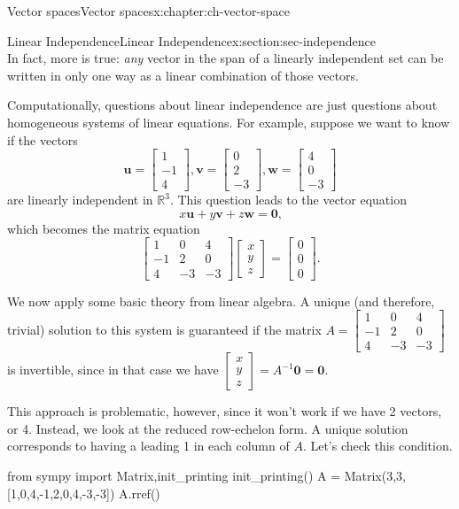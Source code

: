 \documentclass[oneside,10pt,]{book}
\numberwithin{equation}{section}
\newcommand{\bbm}{\begin{bmatrix}}
\newcommand{\ebm}{\end{bmatrix}}
\newcommand{\uu}{\mathbf{u}}
\newcommand{\vv}{\mathbf{v}}
\newcommand{\ww}{\mathbf{w}}
\newcommand{\amp}{&}
\begin{document}
\begin{chapterptx}{Vector spaces}{}{Vector spaces}{}{}{x:chapter:ch-vector-space}
\begin{sectionptx}{Linear Independence}{}{Linear Independence}{}{}{x:section:sec-independence}
\begin{equation*}
\end{equation*}
In fact, more is true: \emph{any} vector in the span of a linearly independent set can be written in only one way as a linear combination of those vectors.%
\par
Computationally, questions about linear independence are just questions about homogeneous systems of linear equations. For example, suppose we want to know if the vectors%
\begin{equation*}
\uu=\bbm 1\\-1\\4\ebm, \vv=\bbm 0\\2\\-3\ebm, \ww=\bbm 4\\0\\-3\ebm
\end{equation*}
are linearly independent in \(\mathbb{R}^3\). This question leads to the vector equation%
\begin{equation*}
x\uu+y\vv+z\ww=\mathbf{0}\text{,}
\end{equation*}
which becomes the matrix equation%
\begin{equation*}
\bbm 1\amp0\amp4\\-1\amp2\amp0\\4\amp-3\amp-3\ebm\bbm x\\y\\z\ebm = \bbm 0\\0\\0\ebm\text{.}
\end{equation*}
%
\par
We now apply some basic theory from linear algebra. A unique (and therefore, trivial) solution to this system is guaranteed if the matrix \(A = \bbm 1\amp0\amp4\\-1\amp2\amp0\\4\amp-3\amp-3\ebm\) is invertible, since in that case we have \(\bbm x\\y\\z\ebm = A^{-1}\mathbf{0} = \mathbf{0}\).%
\par
This approach is problematic, however, since it won't work if we have 2 vectors, or 4. Instead, we look at the reduced row-echelon form. A unique solution corresponds to having a leading 1 in each column of \(A\). Let's check this condition.%
\begin{sageinput}
from sympy import Matrix,init_printing
init_printing()
A = Matrix(3,3,[1,0,4,-1,2,0,4,-3,-3])
A.rref()
\end{sageinput}
\begin{sageoutput}

\end{sageoutput}
\end{sectionptx}
\end{chapterptx}
\end{document}
